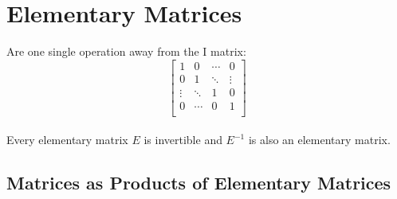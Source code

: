 \documentclass[]{article}
\begin{document}
\section{Elementary Matrices}
Are one single operation away from the I matrix: \\
$$
\begin{bmatrix}
	1      & 0      & \cdots & 0      \\
	0      & 1      & \ddots & \vdots \\
	\vdots & \ddots & 1      & 0      \\
	0      & \cdots & 0      & 1      \\
\end{bmatrix}
$$\\
Every elementary matrix $E$ is invertible and $E^{-1}$ is also an elementary matrix.
\subsection{Matrices as Products of Elementary Matrices}
\end{document}
